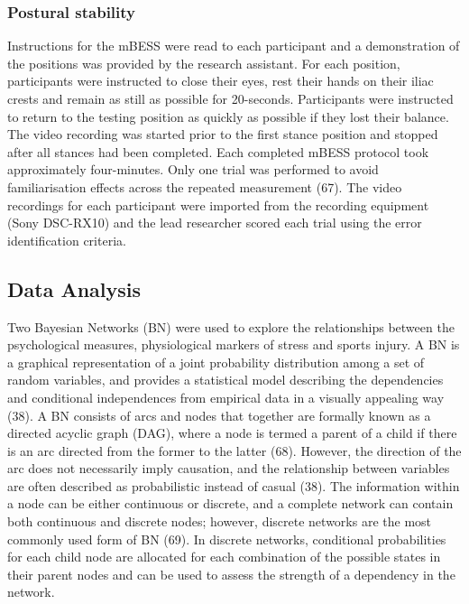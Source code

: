 \documentclass[
  english,
  man]{apa6}
\begin{document}
\hypertarget{postural-stability-1}{%
\subsubsection{Postural stability}\label{postural-stability-1}}

Instructions for the mBESS were read to each participant and a demonstration of the positions was provided by the research assistant.
For each position, participants were instructed to close their eyes, rest their hands on their iliac crests and remain as still as possible for 20-seconds.
Participants were instructed to return to the testing position as quickly as possible if they lost their balance.
The video recording was started prior to the first stance position and stopped after all stances had been completed.
Each completed mBESS protocol took approximately four-minutes.
Only one trial was performed to avoid familiarisation effects across the repeated measurement (67).
The video recordings for each participant were imported from the recording equipment (Sony DSC-RX10) and the lead researcher scored each trial using the error identification criteria.

\hypertarget{data-analysis}{%
\subsection{Data Analysis}\label{data-analysis}}

Two Bayesian Networks (BN) were used to explore the relationships between the psychological measures, physiological markers of stress and sports injury.
A BN is a graphical representation of a joint probability distribution among a set of random variables, and provides a statistical model describing the dependencies and conditional independences from empirical data in a visually appealing way (38).
A BN consists of arcs and nodes that together are formally known as a directed acyclic graph (DAG), where a node is termed a parent of a child if there is an arc directed from the former to the latter (68).
However, the direction of the arc does not necessarily imply causation, and the relationship between variables are often described as probabilistic instead of casual (38).
The information within a node can be either continuous or discrete, and a complete network can contain both continuous and discrete nodes; however, discrete networks are the most commonly used form of BN (69). In discrete networks, conditional probabilities for each child node are allocated for each combination of the possible states in their parent nodes and can be used to assess the strength of a dependency in the network.
\end{document}
